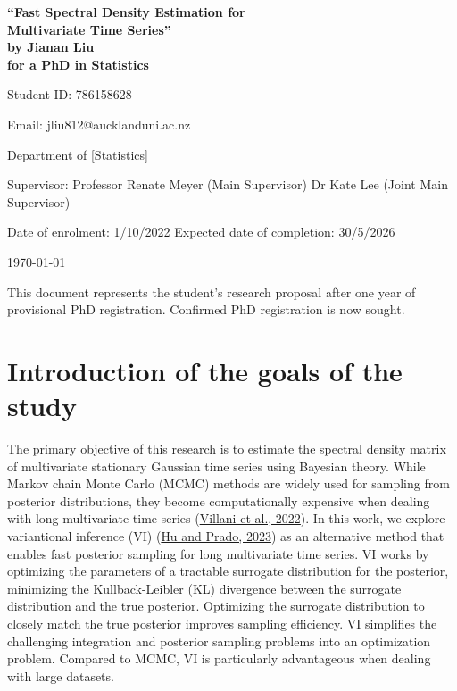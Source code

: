 \documentclass[12pt,a4paper]{article}
\begin{document}
\begin{Large}
\begin{center}
\textbf{``Fast Spectral Density Estimation for \\Multivariate Time Series''} \\
\textbf{by Jianan Liu} \\
\textbf{for a PhD in Statistics}
\end{center}
\end{Large}


\hfill{Student ID: 786158628}

\hfill{Email: jliu812@aucklanduni.ac.nz}

\hfill{Department of [Statistics]}

Supervisor: Professor Renate Meyer (Main Supervisor) Dr Kate Lee (Joint Main Supervisor)

\begin{center}
Date of enrolment: 1/10/2022  
Expected date of completion: 30/5/2026
\end{center}

\begin{center}
\today
\end{center}



This document represents the student's research proposal after
one year of provisional PhD registration.
Confirmed PhD registration is now sought.




\section{Introduction of the goals of the study}
The primary objective of this research is to estimate the spectral density matrix of multivariate stationary Gaussian time series using Bayesian theory. While Markov chain Monte Carlo (MCMC) methods are widely used for sampling from posterior distributions, they become computationally expensive when dealing with long multivariate time series (\hyperref[Villani (2022)]{Villani et al., 2022}). In this work, we explore variantional inference (VI) (\hyperref[hu2023]{Hu and Prado, 2023}) as an alternative method that enables fast posterior sampling for long multivariate time series. VI works by optimizing the parameters of a tractable surrogate distribution for the posterior, minimizing the Kullback-Leibler (KL) divergence between the surrogate distribution and the true posterior. Optimizing the surrogate distribution to closely match the true posterior improves sampling efficiency. VI simplifies the challenging integration and posterior sampling problems into an optimization problem. Compared to MCMC, VI is particularly advantageous when dealing with large datasets.
\end{document}
